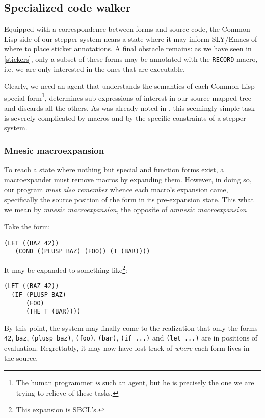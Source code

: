 \documentclass[sigconf]{acmart}
\begin{document}
\subsection{Specialized code walker}

Equipped with a correspondence between forms and source code, the
Common Lisp side of our stepper system nears a state where it may
inform SLY/Emacs of where to place sticker annotations.  A final
obstacle remains: as we have seen in \ref{stickers}, only a subset of
these forms may be annotated with the \texttt{RECORD} macro, i.e. we
are only interested in the ones that are executable.

Clearly, we need an agent that understands the semantics of each
Common Lisp special form\footnote{The human programmer \emph{is} such
  an agent, but he is precisely the one we are trying to relieve of
  these tasks.}, determines sub-expressions of interest in our
source-mapped tree and discards all the others.  As was already noted
in \cite{annotation-based}, this seemingly simple task is severely
complicated by macros and by the specific constraints of a stepper
system.

\subsubsection{Mnesic macroexpansion}

To reach a state where nothing but special and function forms exist, a
macroexpander must remove macros by expanding them.  However, in doing
so, our program \emph{must also remember} whence each macro's
expansion came, specifically the source position of the form in its
pre-expansion state.  This what we mean by \emph{mnesic
  macroexpansion}, the opposite of \emph{amnesic macroexpansion}

Take the form:

\begin{verbatim}
(LET ((BAZ 42))
   (COND ((PLUSP BAZ) (FOO)) (T (BAR))))
\end{verbatim}

It may be expanded to something like\footnote{This expansion is
  SBCL's.}:

\begin{verbatim}
(LET ((BAZ 42))
  (IF (PLUSP BAZ)
      (FOO)
      (THE T (BAR))))
\end{verbatim}

By this point, the system may finally come to the realization that
only the forms \texttt{42}, \texttt{baz}, \texttt{(plusp baz)},
\texttt{(foo)}, \texttt{(bar)}, \texttt{(if ...)} and \texttt{(let
  ...)} are in positions of evaluation.  Regrettably, it may now have
lost track of \emph{where} each form lives in the source.
\end{document}
